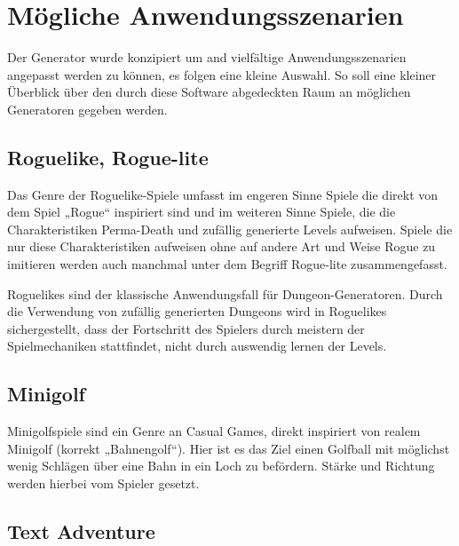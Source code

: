 
\section{Mögliche Anwendungsszenarien}\label{s.anwendungsmöglichkeiten}

Der Generator wurde konzipiert um and vielfältige Anwendungsszenarien angepasst werden zu können, es folgen eine kleine Auswahl. So soll eine kleiner Überblick über den durch diese Software abgedeckten Raum an möglichen Generatoren gegeben werden.

\subsection{Roguelike, Rogue-lite}

Das Genre der Roguelike-Spiele umfasst im engeren Sinne Spiele die direkt von dem Spiel „Rogue“ inspiriert sind und im weiteren Sinne Spiele, die die Charakteristiken Perma-Death und zufällig generierte Levels aufweisen. Spiele die nur diese Charakteristiken aufweisen ohne auf andere Art und Weise Rogue zu imitieren werden auch manchmal unter dem Begriff Rogue-lite zusammengefasst.

Roguelikes sind der klassische Anwendungsfall für Dungeon-Generatoren. Durch die Verwendung von zufällig generierten Dungeons wird in Roguelikes sichergestellt, dass der Fortschritt des Spielers durch meistern der Spielmechaniken stattfindet, nicht durch auswendig lernen der Levels. 


\subsection{Minigolf}

Minigolfspiele sind ein Genre an Casual Games, direkt inspiriert von realem Minigolf (korrekt „Bahnengolf“). Hier ist es das Ziel einen Golfball mit möglichst wenig Schlägen über eine Bahn in ein Loch zu befördern. Stärke und Richtung werden hierbei vom Spieler gesetzt. 


\subsection{Text Adventure}

